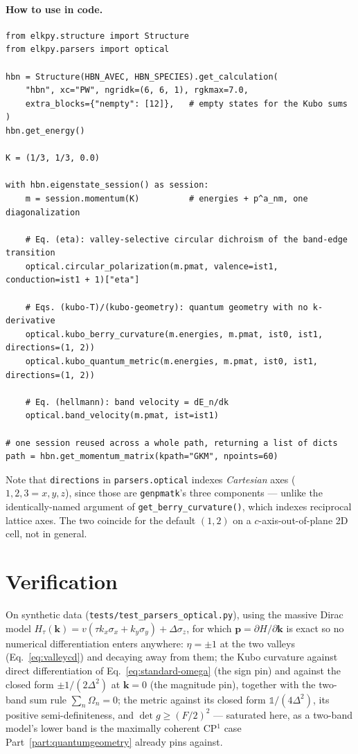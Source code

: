 \documentclass[11pt]{article}
\begin{document}
\paragraph{How to use in code.}
\begin{verbatim}
from elkpy.structure import Structure
from elkpy.parsers import optical

hbn = Structure(HBN_AVEC, HBN_SPECIES).get_calculation(
    "hbn", xc="PW", ngridk=(6, 6, 1), rgkmax=7.0,
    extra_blocks={"nempty": [12]},   # empty states for the Kubo sums
)
hbn.get_energy()

K = (1/3, 1/3, 0.0)

with hbn.eigenstate_session() as session:
    m = session.momentum(K)          # energies + p^a_nm, one diagonalization

    # Eq. (eta): valley-selective circular dichroism of the band-edge transition
    optical.circular_polarization(m.pmat, valence=ist1, conduction=ist1 + 1)["eta"]

    # Eqs. (kubo-T)/(kubo-geometry): quantum geometry with no k-derivative
    optical.kubo_berry_curvature(m.energies, m.pmat, ist0, ist1, directions=(1, 2))
    optical.kubo_quantum_metric(m.energies, m.pmat, ist0, ist1, directions=(1, 2))

    # Eq. (hellmann): band velocity = dE_n/dk
    optical.band_velocity(m.pmat, ist=ist1)

# one session reused across a whole path, returning a list of dicts
path = hbn.get_momentum_matrix(kpath="GKM", npoints=60)
\end{verbatim}

Note that \texttt{directions} in \texttt{parsers.optical} indexes \emph{Cartesian} axes
($1,2,3=x,y,z$), since those are \texttt{genpmatk}'s three components --- unlike the
identically-named argument of \texttt{get\_berry\_curvature()}, which indexes reciprocal
lattice axes. The two coincide for the default $(1,2)$ on a $c$-axis-out-of-plane 2D cell,
not in general.

\section{Verification}
\label{sec:momentum-verification}

On synthetic data (\texttt{tests/test\_parsers\_optical.py}), using the massive Dirac
model $H_\tau(\mathbf k)=v(\tau k_x\sigma_x+k_y\sigma_y)+\Delta\sigma_z$, for which
$\mathbf p=\partial H/\partial\mathbf k$ is exact so no numerical differentiation enters
anywhere: $\eta=\pm1$ at the two valleys (Eq.~\eqref{eq:valleycd}) and decaying away from
them; the Kubo curvature against direct differentiation of
Eq.~\eqref{eq:standard-omega} (the sign pin) and against the closed form
$\pm1/(2\Delta^2)$ at $\mathbf k=0$ (the magnitude pin), together with the two-band sum
rule $\sum_n\Omega_n=0$; the metric against its closed form $\mathbb 1/(4\Delta^2)$, its
positive semi-definiteness, and $\det g\geq(F/2)^2$ --- saturated here, as a two-band
model's lower band is the maximally coherent CP$^1$ case
Part~\ref{part:quantumgeometry} already pins against.
\end{document}
